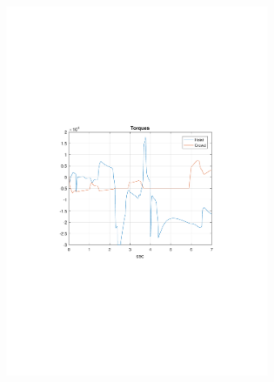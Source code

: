 \documentclass[table]{beamer}
\begin{document}
\begin{frame}[c]
\begin{columns}[c]
\begin{figure}
			\includegraphics[trim=4cm 9cm 4cm 9.5cm, clip=true, width=\linewidth]{img/Example2_Torques}
		\end{figure}
		\begin{figure}
			\centering

\end{figure}
\end{columns}
\end{frame}
\end{document}
